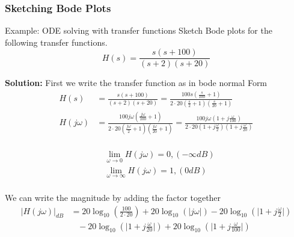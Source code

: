 \documentclass{article}
\begin{document}
\subsubsection{Sketching Bode Plots}
\begin{exampleblock}{Example: ODE solving with transfer functions}
Sketch Bode plots for the following transfer functions.
\begin{equation*}
    H(s) = \frac{s(s+100)}{(s+2)(s+20)}
\end{equation*}

\textbf{Solution:}
First we write the transfer function as in bode normal Form
\begin{align*}
    H(s) &= \frac{s(s+100)}{(s+2)(s+20)} 
     = \frac{100 s(\frac{s}{100}+1)}{2\cdot20(\frac{s}{2}+1)(\frac{s}{20}+1)} \\
    H(j\omega) &= \frac{100 j\omega(\frac{j\omega}{100}+1)}{2\cdot 20(\frac{j\omega}{2}+1)(\frac{j\omega}{20}+1)}
     = \frac{100 j\omega(1+j\frac{\omega}{100})}{2\cdot 20(1+j\frac{\omega}{2})(1+j\frac{\omega}{20})} \\
\end{align*}

\vspace{-1cm}
\begin{align*}
    &\lim_{\omega\to 0} H(j\omega) = 0, (-\infty dB) \\
    &\lim_{\omega\to \infty} H(j\omega) = 1, (0 dB) \\
\end{align*}

\vspace{-0.3cm}
We can write the magnitude by adding the factor together
\begin{align*}
    |H(j\omega)|_{dB} &= 20\log_{10}(\frac{100}{2\cdot 20})
    +20\log_{10}(|j\omega|) 
    -20\log_{10}(\big| 1+j\frac{\omega}{2}\big|) \\
    &\;\;\; -20\log_{10}(\big| 1+j\frac{\omega}{20}\big|)
    +20\log_{10}(\big| 1+j\frac{\omega}{100}\big|) \\
\end{align*}


\end{exampleblock}
\end{document}

